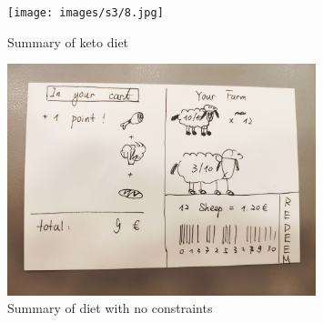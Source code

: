 \begin{figure}[H]
	\centering
	\texttt{[image: images/s3/8.jpg]}
	\caption{ Summary of keto diet }
	\label{s3:sumketo}
\end{figure}


\begin{figure}[H]
	\centering
	\includegraphics[trim={10em 10em 10em 10em}, clip, width=0.8\textwidth]{images/s3/11.jpg}
	\caption{ Summary of diet with no constraints }
	\label{s3:sumnocons}
\end{figure}